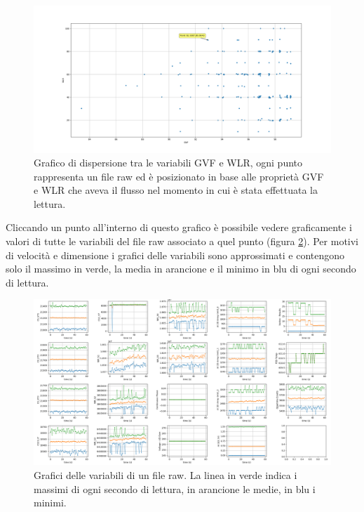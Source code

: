 \begin{figure}[H]
	\includegraphics[width=\textwidth]{figures/GVFWLRscatter}
	\caption[Grafico di dispersione GVF-WLR]{ Grafico di dispersione tra le variabili GVF e WLR,  ogni punto rappresenta un file raw ed è posizionato in base alle proprietà GVF e WLR che aveva il flusso nel momento in cui è stata effettuata la lettura. 
		\label{fig:GVFWLRscatter}}
\end{figure}

Cliccando un punto all'interno di questo grafico è possibile vedere graficamente i valori di tutte le variabili del file raw associato a quel punto (figura \ref{fig:MatrixPlot}). Per motivi di velocità e dimensione i grafici delle variabili sono approssimati e contengono solo il massimo in verde, la media in arancione e il minimo in blu di ogni secondo di lettura.

\begin{figure}[H]
	\includegraphics[width=\textwidth]{figures/MatrixPlot}
	\caption[Grafici delle variabili di un file raw]{ Grafici delle variabili di un file raw. La linea in verde indica i massimi di ogni secondo di lettura, in arancione le medie, in blu i minimi.
		\label{fig:MatrixPlot}}
\end{figure}

